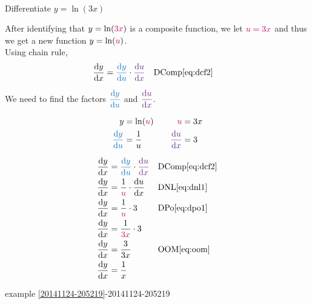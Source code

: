 \documentclass[20150903-160354-rs2.2-MarksMathNotebook.tex]{subfiles}
\begin{document}
\begin{example}[id:20141124-203850] \label{20141124-203850} \hfill \\

Differentiate $y=\ln (3x)$

\soln

\solnsteps

After identifying that $y=\ln (\cRed{3x})$ is a composite function, we let $\cRed{u=3x}$ and thus we get a new function $y=\ln (\cRed{u})$.\\

Using chain rule,
\begin{align*}
\dydx &= \cBlue{\dydu} \cdot \cPurple{\dudx} && \text{DComp} \eqref{eq:dcf2}
\end{align*}

We need to find the factors $\cBlue{\dydu}$ and $\cPurple{\dudx}$.

\begin{alignat*}{2}
		y &= \ln (\cRed{u})				&\quad	 		\cRed{u}		&= 3x \\
	\cBlue{\dydu} &= \dfrac{1}{u}		&\quad 	 \cPurple{\dudx}	 &= 3
\end{alignat*}

\begin{align*}
\dydx &= \cBlue{\dydu} \cdot \cPurple{\dudx} && \text{DComp} \eqref{eq:dcf2} \\
\dydx &= \dfrac{1}{\cRed{u}} \cdot \dudx && \text{DNL} \eqref{eq:dnl1} \\
\dydx &= \dfrac{1}{\cRed{u}} \cdot 3 && \text{DPo} \eqref{eq:dpo1} \\
\dydx &= \dfrac{1}{\cRed{3x}} \cdot 3 \\	%
\dydx &= \dfrac{3}{3x} && \text{OOM} \eqref{eq:oom} \\
\dydx &= \dfrac{1}{x} %
\end{align*}

\qdepend

\qdependlist

example \ref{20141124-205219}-20141124-205219

\end{example}
\end{document}
